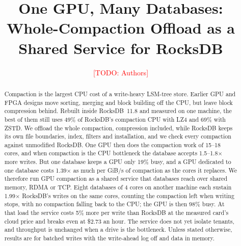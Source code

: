 \documentclass[sigconf, nonacm]{acmart}
\newcommand{\todo}[1]{\textcolor{red}{[TODO: #1]}}
\begin{document}
\title{One GPU, Many Databases: Whole-Compaction Offload as a Shared Service for RocksDB}

\author{\todo{Authors}}
\affiliation{\institution{\todo{Institution}}\city{\todo{City}}\country{\todo{Country}}}

\begin{abstract}
Compaction is the largest CPU cost of a write-heavy LSM-tree store. Earlier GPU and FPGA
designs move sorting, merging and block building off the CPU, but leave block compression
behind. Rebuilt inside RocksDB~11.8 and measured on one machine, the best of them still uses
49\% of RocksDB's compaction CPU with LZ4 and 69\% with ZSTD. We offload the whole compaction,
compression included, while RocksDB keeps its own file boundaries, index, filters and
installation, and we check every compaction against unmodified RocksDB. One GPU then does the
compaction work of 15--18 cores, and when compaction is the CPU bottleneck the database
accepts 1.5--1.8$\times$ more writes. But one database keeps a GPU only 19\% busy, and a GPU
dedicated to one database costs 1.39$\times$ as much per GiB/s of compaction as the cores it
replaces. We therefore run GPU compaction as a shared service that databases reach over
shared memory, RDMA or TCP. Eight databases of 4 cores on another machine each sustain
1.99$\times$ RocksDB's writes on the same cores, counting the compaction left when writing
stops, with no compaction falling back to the CPU; the GPU is then 98\% busy. At that load the
service costs 5\% more per write than RocksDB at the measured card's cloud price and breaks
even at \$2.73 an hour. The service does not yet isolate tenants, and throughput is unchanged
when a drive is the bottleneck. Unless stated otherwise, results are for batched writes with
the write-ahead log off and data in memory.
\end{abstract}

\maketitle
\end{document}
